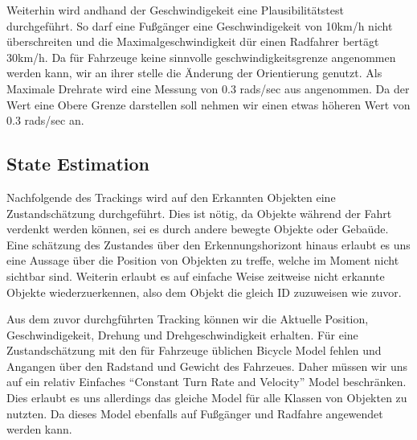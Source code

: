 \documentclass[11pt,oneside,openright]{mpreport}
\begin{document}
Weiterhin wird andhand der Geschwindigekeit eine Plausibilitätstest durchgeführt. So darf eine Fußgänger eine Geschwindigekeit von 10km/h nicht überschreiten und die Maximalgeschwindigkeit dür einen 
Radfahrer bertägt 30km/h. Da für Fahrzeuge keine sinnvolle geschwindigkeitsgrenze angenommen werden kann, wir an ihrer stelle die Änderung der Orientierung genutzt. Als Maximale Drehrate wird
eine Messung von 0.3 rads/sec aus \cite{Kelly1994} angenommen. Da der Wert eine Obere Grenze darstellen soll nehmen wir einen etwas höheren  Wert von  0.3 rads/sec an.


%     
%   


\subsection{State Estimation}

Nachfolgende des Trackings wird auf den Erkannten Objekten eine Zustandschätzung durchgeführt. Dies ist nötig, da Objekte während der Fahrt verdenkt werden können,
sei es durch andere bewegte Objekte oder Gebaüde. Eine schätzung des Zustandes über den Erkennungshorizont hinaus erlaubt es uns eine Aussage über die Position von
Objekten zu treffe, welche im Moment nicht sichtbar sind. Weiterin erlaubt es auf einfache Weise zeitweise nicht erkannte Objekte wiederzuerkennen, also dem Objekt
die gleich ID zuzuweisen wie zuvor. 

Aus dem zuvor durchgführten Tracking können wir die Aktuelle Position, Geschwindigekeit, Drehung und Drehgeschwindigkeit erhalten. 
Für eine Zustandschätzung mit den für Fahrzeuge üblichen Bicycle Model fehlen und Angangen über den Radstand und Gewicht des Fahrzeues.
Daher müssen wir uns auf ein relativ Einfaches ``Constant Turn Rate and Velocity'' Model beschränken. Dies erlaubt es uns allerdings das gleiche
Model für alle Klassen von Objekten zu nutzten. Da dieses Model ebenfalls auf Fußgänger und Radfahre angewendet werden kann.
\end{document}
